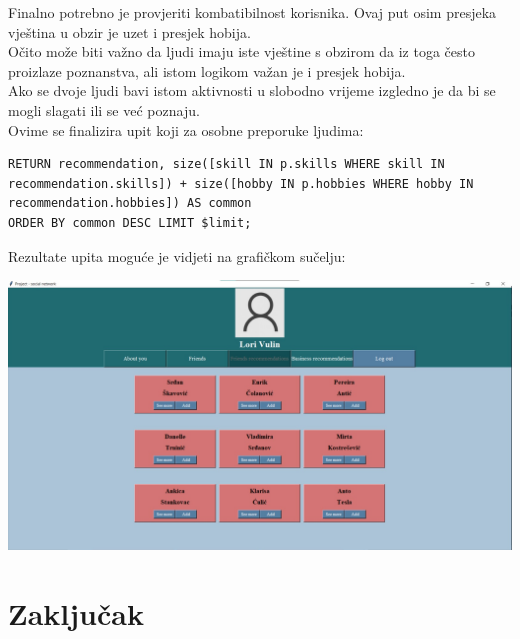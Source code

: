 \documentclass[titlepage, 12pt]{scrartcl}
\begin{document}
Finalno potrebno je provjeriti kombatibilnost korisnika. Ovaj put osim presjeka vještina u obzir je uzet i presjek hobija. \\
Očito može biti važno da ljudi imaju iste vještine s obzirom da iz toga često proizlaze poznanstva, ali istom logikom važan je i presjek hobija. \\
Ako se dvoje ljudi bavi istom aktivnosti u slobodno vrijeme izgledno je da bi se mogli slagati ili se već poznaju. \\
Ovime se finalizira upit koji za osobne preporuke ljudima:
\begin{samepage}
\begin{verbatim}
RETURN recommendation, size([skill IN p.skills WHERE skill IN recommendation.skills]) + size([hobby IN p.hobbies WHERE hobby IN recommendation.hobbies]) AS common 
ORDER BY common DESC LIMIT $limit;

\end{verbatim}
\end{samepage}
\newpage
\begin{samepage}
Rezultate upita moguće je vidjeti na grafičkom sučelju:
\begin{center}
    \includegraphics[scale=0.19]{slike/personal.jpg}
\end{center}
\end{samepage}

\newpage
\section{Zaključak}
\end{document}
